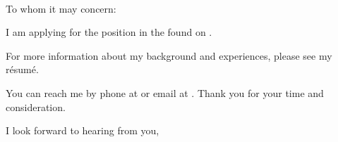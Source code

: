 \begin{letter}{
    \vCompanyName{}\\
    \vCompanyAddress{}
}
    \begin{center}
        \vMyAddress{}
    \end{center}

    \signature{\vMySignature{}}

    \opening{To whom it may concern:}

    I am applying for the \vJobPosition{} position in the \vJobDepartment{} found on \vJobFound{}.

    

    For more information about my background and experiences, please see my r\'esum\'e.

    You can reach me by phone at \vMyPhone{} or email at \vMyEmail{}.  Thank you for your time and consideration.

    \addtolength{\medskipamount}{-.95\medskipamount}
    \closing{I look forward to hearing from you,}
    \addtolength{\medskipamount}{19\medskipamount}

\end{letter}
